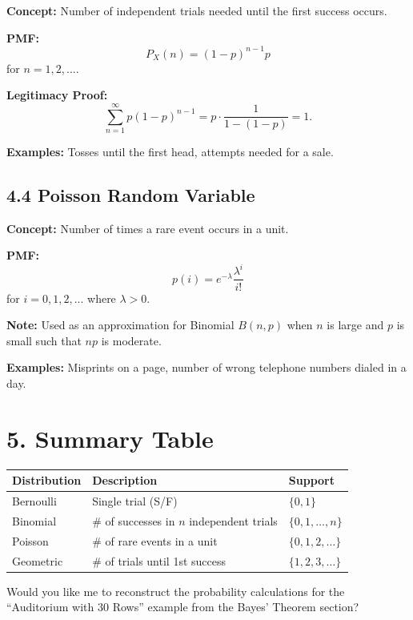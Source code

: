 \documentclass{article}
\begin{document}
\textbf{Concept:} Number of independent trials needed until the first success occurs.

\textbf{PMF:}
\[
P_{X}(n)=(1-p)^{n-1}p
\]
for $n=1,2,...$.

\textbf{Legitimacy Proof:}
\[
\sum_{n=1}^{\infty}p(1-p)^{n-1} = p \cdot \frac{1}{1-(1-p)} = 1.
\]

\textbf{Examples:} Tosses until the first head, attempts needed for a sale.

\subsection*{4.4 Poisson Random Variable}

\textbf{Concept:} Number of times a rare event occurs in a unit.

\textbf{PMF:}
\[
p(i)=e^{-\lambda}\frac{\lambda^{i}}{i!}
\]
for $i=0,1,2,...$ where $\lambda > 0$.

\textbf{Note:} Used as an approximation for Binomial $B(n,p)$ when $n$ is large and $p$ is small such that $np$ is moderate.

\textbf{Examples:} Misprints on a page, number of wrong telephone numbers dialed in a day.

\section*{5. Summary Table}

\begin{center}
\begin{tabular}{|l|l|l|}
\hline
Distribution & Description & Support \\
\hline
Bernoulli & Single trial (S/F) & $\{0,1\}$ \\
Binomial & \# of successes in $n$ independent trials & $\{0,1,\ldots,n\}$ \\
Poisson & \# of rare events in a unit & $\{0,1,2,\ldots\}$ \\
Geometric & \# of trials until 1st success & $\{1,2,3,\ldots\}$ \\
\hline
\end{tabular}
\end{center}

Would you like me to reconstruct the probability calculations for the ``Auditorium with 30 Rows'' example from the Bayes' Theorem section?
\end{document}
